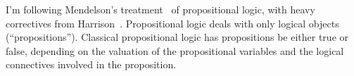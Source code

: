 \begin{node}\label{prop-0000}%
I'm following Mendelson's treatment~\cite{mendelson2015mathematical} of
propositional logic, with heavy correctives from
Harrison~\cite{harrison2009handbook}. Propositional logic deals with
only logical objects (``propositions''). Classical propositional logic
has propositions be either true or false, depending on the valuation of
the propositional variables and the logical connectives involved in the
proposition.
\end{node}
